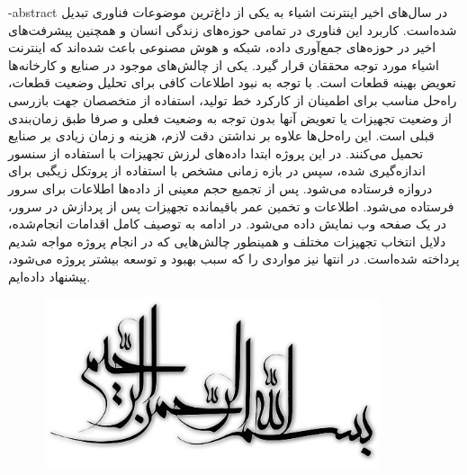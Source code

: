 \name{}
\surname{}

\fa-abstract{
در سال‌های اخیر اینترنت اشیاء به یکی از داغ‌ترین موضوعات فناوری تبدیل شده‌است. کاربرد این فناوری در تمامی حوزه‌های زندگی انسان و همچنین پیشرفت‌های اخیر در حوزه‌های جمع‌آوری داده، شبکه و هوش مصنوعی باعث شده‌اند که اینترنت اشیاء مورد توجه محققان قرار گیرد. یکی از چالش‌های موجود در صنایع و کارخانه‌ها تعویض بهینه قطعات است. با توجه به نبود اطلاعات کافی برای تحلیل وضعیت قطعات، راه‌حل مناسب برای اطمینان از کارکرد خط تولید، استفاده از متخصصان جهت بازرسی از وضعیت تجهیزات یا تعویض آنها بدون توجه به وضعیت فعلی و صرفا طبق زمان‌بندی قبلی است. این راه‌حل‌ها علاوه بر نداشتن دقت لازم، هزینه و زمان زیادی بر صنایع تحمیل می‌کنند. در این پروژه ابتدا داده‌های لرزش تجهیزات با استفاده از سنسور  اندازه‌گیری شده، سپس در بازه زمانی مشخص با استفاده از پروتکل زیگبی برای دروازه فرستاده می‌شود. پس از تجمیع حجم معینی از داده‌ها اطلاعات برای سرور فرستاده می‌شود. اطلاعات و تخمین عمر باقیمانده تجهیزات پس از پردازش در سرور، در یک صفحه وب نمایش داده می‌شود. در ادامه به توصیف کامل اقدامات انجام‌شده، دلایل انتخاب تجهیزات مختلف و همینطور چالش‌هایی که در انجام پروژه مواجه شدیم پرداخته شده‌است. در انتها نیز مواردی را که سبب بهبود و توسعه بیشتر پروژه می‌شود، پیشنهاد داده‌ایم.
}





\AUTtitle
\vspace*{7cm}
\thispagestyle{empty}
\begin{center}
\includegraphics[height=5cm,width=12cm]{besm}
\end{center}